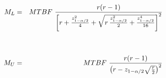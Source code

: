 \documentclass[12pt]{article}
\begin{document}
\pagestyle{empty}
\Large
{}
\pagecolor{ehandbook}

\boldmath
\begin{eqnarray*}
\hspace*{-.5in}
M_L & = & MTBF \,\, \frac{r(r-1)}{\left[ r + \frac{z^2_{1-\alpha/2}}{4} + \sqrt{r \, \frac{z^2_{1-\alpha/2}}{2} + \frac{z^4_{1-\alpha/2}}{16}} \right]^2} \\
       &    & \\
       &    & \\
M_U & = & MTBF \,\, \frac{r(r-1)}{\left( r - z_{1-\alpha/2} \sqrt{\frac{r}{2}} \right)^2}
\end{eqnarray*}

 
\end{document}
